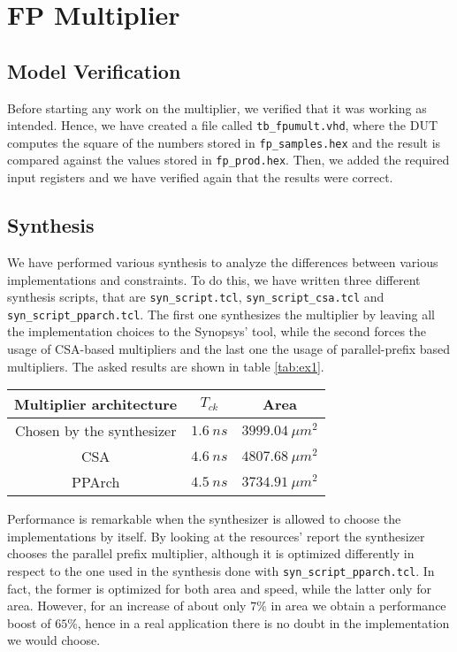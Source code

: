 \chapter{FP Multiplier}

\section{Model Verification}

Before starting any work on the multiplier, we verified that it was working as intended.
Hence, we have created a file called \verb|tb_fpumult.vhd|, where the DUT computes the
square of the numbers stored in \verb|fp_samples.hex| and the result is compared against the
values stored in \verb|fp_prod.hex|.
Then, we added the required input registers and we have verified again that the results were correct.

\section{Synthesis}

We have performed various synthesis to analyze the differences between various implementations and constraints.
To do this, we have written three different synthesis scripts, that are \verb|syn_script.tcl|, \verb|syn_script_csa.tcl|
and \verb|syn_script_pparch.tcl|. The first one synthesizes the multiplier by leaving all the implementation choices to
the Synopsys' tool, while the second forces the usage of CSA-based multipliers and the last one the usage of parallel-prefix based
multipliers. The asked results are shown in table \ref{tab:ex1}.

\begin{center}
    \label{tab:ex1}
    \begin{tabular}{ |c|c|c| }
        \hline
        Multiplier architecture & $T_{ck}$ & Area \\
        \hline
        Chosen by the synthesizer & $1.6\ ns$ & $3999.04\ \mu m^2$ \\
        \hline
        CSA & $4.6\ ns$ & $4807.68\ \mu m^2$ \\
        \hline
        PPArch & $4.5\ ns$ & $3734.91\ \mu m^2$ \\
        \hline
    \end{tabular}
\end{center}

Performance is remarkable when the synthesizer is allowed to choose the implementations by itself. By looking at
the resources' report the synthesizer chooses the parallel prefix multiplier, although it is optimized differently
in respect to the one used in the synthesis done with \verb|syn_script_pparch.tcl|. In fact, the former is optimized
for both area and speed, while the latter only for area. However, for an increase of about only $7\%$ in area we obtain
a performance boost of $65\%$, hence in a real application there is no doubt in the implementation we would choose.

